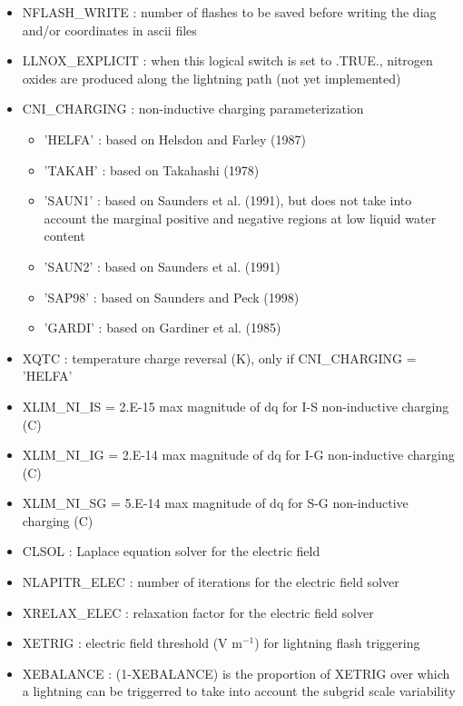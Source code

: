 \begin{itemize}
  \item NFLASH\_WRITE : number of flashes to be saved before writing the diag and/or coordinates in ascii files
  \item LLNOX\_EXPLICIT : when this logical switch is set to .TRUE., nitrogen oxides are produced along the lightning path (not yet implemented)
  \item CNI\_CHARGING : non-inductive charging parameterization
    \begin{itemize}
      \item 'HELFA' : based on Helsdon and Farley (1987)
      \item 'TAKAH' : based on Takahashi (1978)
      \item 'SAUN1' : based on Saunders et al. (1991), but does not take into account the marginal positive and negative regions at low liquid water content
      \item 'SAUN2' : based on Saunders et al. (1991)
      \item 'SAP98' : based on Saunders and Peck (1998)
      \item 'GARDI' : based on Gardiner et al. (1985)
    \end{itemize}
  \item XQTC : temperature charge reversal (K), only if CNI\_CHARGING = 'HELFA'
  \item XLIM\_NI\_IS = 2.E-15 max magnitude of dq for I-S non-inductive charging (C)
  \item XLIM\_NI\_IG = 2.E-14 max magnitude of dq for I-G non-inductive charging (C)
  \item XLIM\_NI\_SG = 5.E-14 max magnitude of dq for S-G non-inductive charging (C)
  \item CLSOL : Laplace equation solver for the electric field
  \item NLAPITR\_ELEC : number of iterations for the electric field solver
  \item XRELAX\_ELEC : relaxation factor for the electric field solver
  \item XETRIG : electric field threshold (V m$^{-1}$) for lightning flash triggering
  \item XEBALANCE : (1-XEBALANCE) is the proportion of XETRIG over which a lightning can be triggerred to take into account the subgrid scale variability

\end{itemize}
